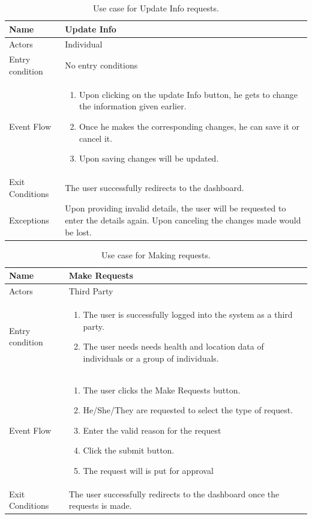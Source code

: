\begin{table}[H]
\begin{tabular}{| l | p{} |}
\hline
Name & Update Info\\
\hline
Actors & Individual\\
\hline
Entry condition & No entry conditions\\
\hline
Event Flow & \begin{enumerate}
\item Upon clicking on the update Info button, he gets to change the information given earlier.
\item Once he makes the corresponding changes, he can save it or cancel it.
\item Upon saving changes will be updated.
\end{enumerate}
\\
\hline
Exit Conditions & 
The user successfully redirects to the dashboard.\\
\hline
Exceptions & Upon providing invalid details, the user will be requested to enter the details again. Upon canceling the changes made would be lost.\\
\hline
\end{tabular}
\caption{Use case for Update Info requests.}
\label{usecase-taxiavailability}
\end{table}

\begin{table}[H]
\begin{tabular}{| l | p{} |}
\hline
Name & Make Requests\\
\hline
Actors & Third Party\\
\hline
Entry condition & \begin{enumerate}
\item The user is successfully logged into the system as a third party.
\item The user needs needs health and location data of individuals or a group of individuals.
\end{enumerate}\\
\hline
Event Flow & \begin{enumerate}
\item The user clicks the Make Requests button.
\item He/She/They are requested to select the type of request. 
\item Enter the valid reason for the request
\item Click the submit button.
\item The request will is put for approval
\end{enumerate}
\\
\hline
Exit Conditions & The user successfully redirects to the dashboard once the requests is made.\\
\hline
\end{tabular}
\caption{Use case for Making requests.}
\label{usecase-Making-requests}
\end{table}


